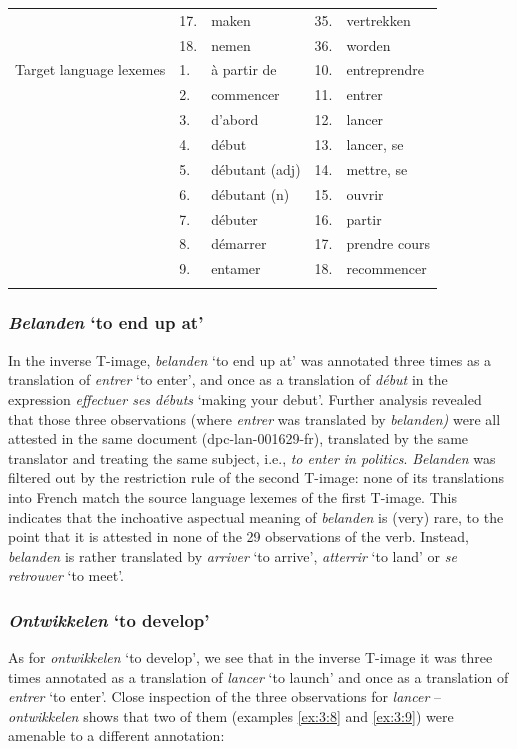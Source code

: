 \begin{table}[p]
\begin{tabularx}{\textwidth}{p{}lXlX}
\rowcolor{lsLightGray}& 17.& maken & 35.& vertrekken\\
\rowcolor{lsLightGray}& 18.& nemen & 36.& worden \\
Target language lexemes & 1.& à partir de & 10.& entreprendre\\
& 2.& commencer & 11.& entrer\\
& 3.& d'abord & 12.& lancer\\
& 4.& début & 13.& lancer, se\\
& 5.& débutant (adj) & 14.& mettre, se\\
& 6.& débutant (n) & 15.& ouvrir\\
& 7.& débuter & 16.& partir\\
& 8.& démarrer & 17.& prendre cours\\
& 9.& entamer & 18.& recommencer\\
\lspbottomrule
\end{tabularx}
\end{table}


\clearpage\subsubsection{\textit{Belanden} `to end up at'}
In the inverse T-image, \textit{belanden} `to end up at' was annotated three times as a translation of \textit{entrer} `to enter', and once as a translation of \textit{début} in the expression \textit{effectuer ses débuts} `making your debut'. Further analysis revealed that those three observations (where \textit{entrer} was translated by \textit{belanden)} were all attested in the same document (dpc-lan-001629-fr), translated by the same translator and treating the same subject, i.e., \textit{to enter in politics}. \textit{Belanden} was filtered out by the restriction rule of the second T-image: none of its translations into French match the source language lexemes of the first T-image. This indicates that the inchoative aspectual meaning of \textit{belanden} is (very) rare, to the point that it is attested in none of the 29 observations of the verb. Instead, \textit{belanden} is rather translated by \textit{arriver} `to arrive', \textit{atterrir} `to land' or \textit{se retrouver} `to meet'.

\subsubsection{\textit{Ontwikkelen} `to develop'}

As for \textit{ontwikkelen} `to develop', we see that in the inverse T-image it was three times annotated as a translation of \textit{lancer} `to launch' and once as a translation of \textit{entrer} `to enter'. Close inspection of the three observations for \textit{lancer} -- \textit{ontwikkelen} shows that two of them (examples \ref{ex:3:8} and \ref{ex:3:9}) were amenable to a different annotation:

